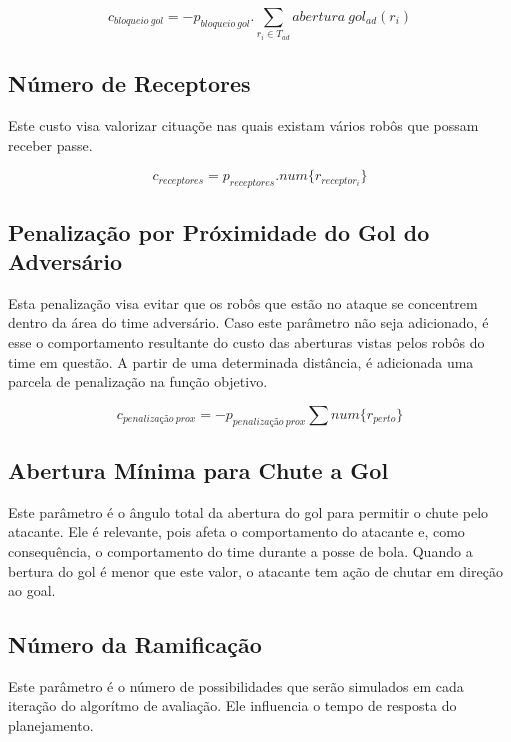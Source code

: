 \begin{dmath}
   c_{bloqueio{\ }gol} = - p_{bloqueio{\ }gol} .
    \sum_{r_i \in T_{ad}} abertura{\ }gol_{ad}(r_i)
\end{dmath}

\subsection{Número de Receptores}

Este custo visa valorizar cituaçõe nas quais existam
vários robôs que possam receber passe.

\begin{dmath}
  c_{receptores} = p_{receptores} .
   num \lbrace r_{receptor_i} \rbrace
\end{dmath}

\subsection{Penalização por Próximidade do Gol do Adversário}
Esta penalização visa evitar que os robôs que estão no ataque
se concentrem dentro da área do time adversário. Caso este
parâmetro não seja adicionado, é esse o comportamento resultante
do custo das aberturas vistas pelos robôs do time em questão. 
A partir de uma determinada distância, é adicionada uma parcela
de penalização na função objetivo.

\begin{dmath}
  c_{penalização{\ }prox} = - p_{penalização{\ }prox}
    \sum num \lbrace r_{perto} \rbrace
\end{dmath}

\subsection{Abertura Mínima para Chute a Gol}
Este parâmetro é o ângulo total da abertura do gol para permitir
o chute pelo atacante. Ele é relevante, pois afeta o comportamento
do atacante e, como consequência, o comportamento do time durante
a posse de bola. Quando a bertura do gol é menor que este valor, o
atacante tem ação de chutar em direção ao goal.


\subsection{Número da Ramificação}
Este parâmetro é o número de possibilidades que serão simulados
em cada iteração do algorítmo de avaliação. Ele influencia o
tempo de resposta do planejamento.

